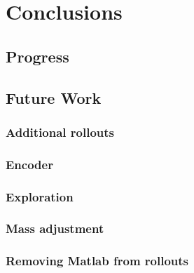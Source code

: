\documentclass[twoside,twocolumn,12pt]{article}
\begin{document}

\clearpage
\section{Conclusions}
\subsection{Progress}

\subsection{Future Work}


\subsubsection{Additional rollouts}


\subsubsection{Encoder}


\subsubsection{Exploration}


\subsubsection{Mass adjustment}


\subsubsection{Removing Matlab from rollouts}


\end{document}
